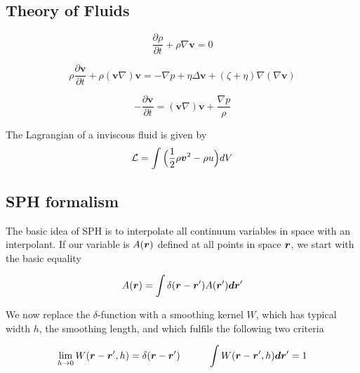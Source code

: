 \subsection{Theory of Fluids}

\begin{equation}
\label{ch02_fld01_eq001}
\frac{\partial \rho}{\partial t} + \rho \nabla \mathbf{v} = 0
\end{equation}

\begin{equation}
\label{ch02_fld01_eq002}
\rho \frac{\partial \mathbf{v}}{\partial t} + \rho ( \mathbf{v} \nabla ) \mathbf{v} = - \nabla p + \eta \Delta \mathbf{v} + ( \zeta + \eta ) \nabla ( \nabla \mathbf{v} )
\end{equation}

\label{ch02_fld01_eq003}
\begin{equation}
- \frac{\partial \mathbf{v}}{\partial t} =  ( \mathbf{v} \nabla ) \mathbf{v} + \frac{\nabla p}{\rho}
\end{equation}

The Lagrangian of a inviscous fluid is given by
\begin{equation}
\label{ch02_fld01_eq004}
\mathcal{L} = \int \Big( \frac{1}{2} \rho \boldsymbol{v} ^2 - \rho u \Big) dV
\end{equation}

\citep{Thorne:2008}
\citep{2004Nyffeler}
\subsection{SPH formalism}
The basic idea of SPH is to interpolate all continuum variables in space with an interpolant.
If our variable is $A(\boldsymbol{r})$ defined at all points in space $\boldsymbol{r}$, we start with the basic equality

\begin{equation}
\label{ch02_sph01_eq001}
A(\boldsymbol{r}) = \int  \delta(\boldsymbol{r} - \boldsymbol{r}') A(\boldsymbol{r}') \boldsymbol{d} \boldsymbol{r}'
\end{equation}

We now replace the $\delta$-function with a smoothing kernel $W$, which has typical width $h$, the smoothing length, and which fulfils the following two criteria

\begin{equation}
\label{ch02_sph01_eq002}
\lim_{h \to 0} W(\boldsymbol{r} - \boldsymbol{r}', h) = \delta(\boldsymbol{r} - \boldsymbol{r}') \hspace{1.0cm}
\int W(\boldsymbol{r} - \boldsymbol{r}', h) \boldsymbol{d} \boldsymbol{r}' = 1
\end{equation}


